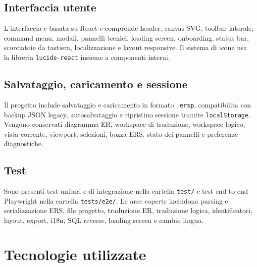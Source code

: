 \subsection{Interfaccia utente}

L'interfaccia e basata su React e comprende header, canvas SVG, toolbar laterale, command menu, modali, pannelli tecnici, loading screen, onboarding, status bar, scorciatoie da tastiera, localizzazione e layout responsive. Il sistema di icone usa la libreria \texttt{lucide-react} insieme a componenti interni.

\subsection{Salvataggio, caricamento e sessione}

Il progetto include salvataggio e caricamento in formato \texttt{.ersp}, compatibilita con backup JSON legacy, autosalvataggio e ripristino sessione tramite \texttt{localStorage}. Vengono conservati diagramma ER, workspace di traduzione, workspace logico, vista corrente, viewport, selezioni, bozza ERS, stato dei pannelli e preferenze diagnostiche.

\subsection{Test}

Sono presenti test unitari e di integrazione nella cartella \texttt{test/} e test end-to-end Playwright nella cartella \texttt{tests/e2e/}. Le aree coperte includono parsing e serializzazione ERS, file progetto, traduzione ER, traduzione logica, identificatori, layout, export, i18n, SQL reverse, loading screen e cambio lingua.

\section{Tecnologie utilizzate}

